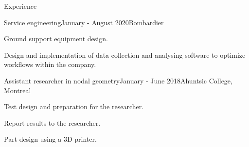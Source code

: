 \documentclass[french,12pt]{resume} %
\begin{document}
	
	
	\begin{rSection}{Experience}
		
		\begin{rSubsection}{Service engineering}{January - August 2020}{Bombardier}{}{}
			\item Ground support equipment design.
			\item Design and implementation of data collection and analysing software to optimize workflows within the company.
		\end{rSubsection}
		
		\begin{rSubsection}{Assistant researcher in nodal geometry}{January - June 2018}{Ahuntsic College, Montreal}{}
			\item   Test design and preparation for the researcher.
			\item   Report results to the researcher.
			\item   Part design using a 3D printer.
		\end{rSubsection}
		
		
	\end{rSection}
	
	
	\iffalse
	\begin{rSection}{Accomplissements académiques} 
		\begin{rSubsection}{Collège Ahuntsic, Montréal}{2018}{Bourse d'implication scientifique}
			 
		\end{rSubsection}
		\begin{rSubsection}{Polytechnique Montréal}{2018}{Bourse d'excellence à l'admission}
			  
		\end{rSubsection}
		
	\end{rSection}
	\fi
	
\end{document}
